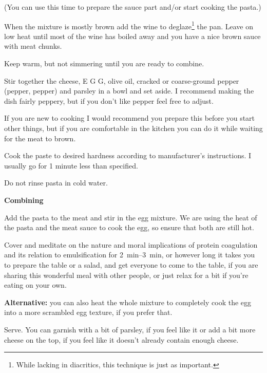 \begin{recipe}
{    (You can use this time to prepare the sauce part and/or start cooking the pasta.)

    \vspace{1em}

    \step When the mixture is mostly brown add the wine to deglaze\footnote{While lacking in diacritics, this technique is just as important.} the pan. Leave on low heat until most of the wine has boiled away and you have a nice brown sauce with meat chunks.

    \step Keep warm, but not simmering until you are ready to combine.

    \vspace{1em}

    \step Stir together the cheese, E G G, olive oil, cracked or coarse-ground pepper (pepper, pepper) and parsley in a bowl and set aside. I recommend making the dish fairly peppery, but if you don’t like pepper feel free to adjust.

    If you are new to cooking I would recommend you prepare this before you start other things, but if you are comfortable in the kitchen you can do it while waiting for the meat to brown.

    \step Cook the paste to desired hardness according to manufacturer's instructions. I usually go for 1 minute less than specified.

    \step Do not rinse pasta in cold water.

    \vspace{1em}
    {\large\textbf{Combining}}

    \step Add the pasta to the meat and stir in the egg mixture. We are using the heat of the pasta and the meat sauce to cook the egg, so ensure that both are still hot.

    \step Cover and meditate on the nature and moral implications of protein coagulation and its relation to emulsification for \SIrange{2}{3}{\minute}, or however long it takes you to prepare the table or a salad, and get everyone to come to the table, if you are sharing this wonderful meal with other people, or just relax for a bit if you’re eating on your own.

    \textbf{Alternative:} you can also heat the whole mixture to completely cook the egg into a more scrambled egg texture, if you prefer that.

    \step Serve. You can garnish with a bit of parsley, if you feel like it or add a bit more cheese on the top, if you feel like it doesn’t already contain enough cheese.
    }

\end{recipe}